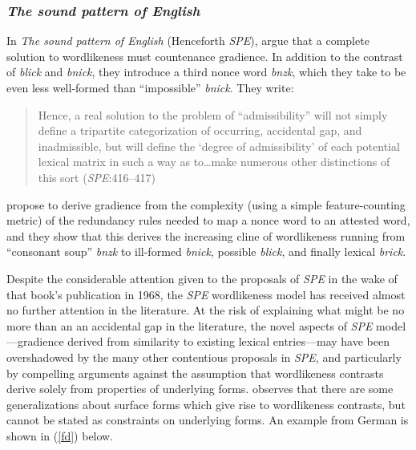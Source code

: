 \subsubsection{\emph{The sound pattern of English}} 
\label{2spe}

In \emph{The sound pattern of English} (Henceforth \emph{SPE}), \citet{SPE} argue that a complete solution to wordlikeness must countenance gradience. In addition to the contrast of \emph{blick} and \emph{bnick}, they introduce a third nonce word \emph{bnzk}, which they take to be even less well-formed than ``impossible'' \emph{bnick}. They write:

\begin{quote}
Hence, a real solution to the problem of ``admissibility'' will not simply define a tripartite categorization of occurring, accidental gap, and inadmissible, but will define the `degree of admissibility' of each potential lexical matrix in such a way as to\ldots{}make numerous other distinctions of this sort (\emph{SPE}:416--417)
\end{quote}


\citeauthor{SPE} propose to derive gradience from the complexity (using a simple feature-counting metric) of the redundancy rules needed to map a nonce word to an attested word, and they show that this derives the increasing cline of wordlikeness running from ``consonant soup'' \emph{bnzk} to ill-formed \emph{bnick}, possible \emph{blick}, and finally lexical \emph{brick}.

Despite the considerable attention given to the proposals of \emph{SPE} in the wake of that book's publication in 1968, the \emph{SPE} wordlikeness model has received almost no further attention in the literature. At the risk of explaining what might be no more than an an accidental gap in the literature, the novel aspects of \emph{SPE} model---gradience derived from similarity to existing lexical entries---may have been overshadowed by the many other contentious proposals in \emph{SPE}, and particularly by compelling arguments against the assumption that wordlikeness contrasts derive solely from properties of underlying forms. \citet{Shibatani1973} observes that there are some generalizations about surface forms which give rise to wordlikeness contrasts, but cannot be stated as constraints on underlying forms. An example from German is shown in (\ref{fd}) below.

